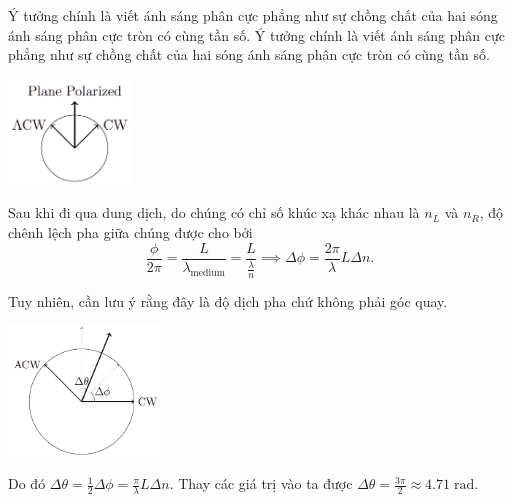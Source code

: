\begin{solution} Ý tưởng chính là viết ánh sáng phân cực phẳng như sự chồng chất của hai sóng ánh sáng phân cực tròn có cùng tần số. Ý tưởng chính là viết ánh sáng phân cực phẳng như sự chồng chất của hai sóng ánh sáng phân cực tròn có cùng tần số.
\begin{center}
    \includegraphics[width=0.25\textwidth]{solutions/figures/polarization-decomposition.png}
\end{center}
    
Sau khi đi qua dung dịch, do chúng có chỉ số khúc xạ khác nhau là $n_L$ và $n_R$, độ chênh lệch pha giữa chúng được cho bởi
$$\frac{\phi}{2\pi} = \frac{L}{\lambda_{\text{medium}}} = \frac{L}{\frac{\lambda}{n}} \implies \Delta \phi = \frac{2\pi}{\lambda}L\Delta n.$$
    
Tuy nhiên, cần lưu ý rằng đây là độ dịch pha chứ không phải góc quay.

\begin{center}
    \includegraphics[width=0.3\textwidth]{solutions/figures/rotation-shift.png}
\end{center}
    
Do đó $\Delta \theta = \frac{1}{2}\Delta \phi = \frac{\pi}{\lambda} L \Delta n$. Thay các giá trị vào ta được $\boxed{\Delta \theta = \frac{3\pi}{2} \approx 4.71\;\mathrm{rad}}$.

\end{solution}
